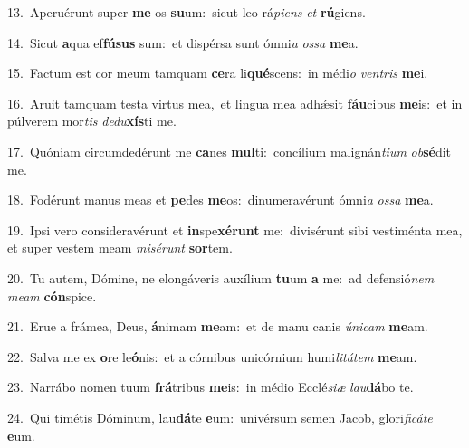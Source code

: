 {\numbfont\textcolor{\numbcolor}{13.}}~Aperuérunt super \textbf{me} os \textbf{su}\-um:~\star sicut leo rá\-\textit{pi}\-\textit{ens} \textit{et} \textbf{rú}\-giens.\par
{\numbfont\textcolor{\numbcolor}{14.}}~Sicut \textbf{a}\-qua ef\-\textbf{fú}\-\textbf{sus} sum:~\star et dispérsa sunt ómni\textit{a} \textit{os}\-\textit{sa} \textbf{me}\-a.\par
{\numbfont\textcolor{\numbcolor}{15.}}~Factum est cor meum tamquam \textbf{ce}\-ra li\-\textbf{qué}\-scens:~\star in médi\textit{o} \textit{ven}\-\textit{tris} \textbf{me}\-i.\par
{\numbfont\textcolor{\numbcolor}{16.}}~Aruit tamquam testa virtus mea,~\dagger et lingua mea adhǽsit \textbf{fáu}\-cibus \textbf{me}\-is:~\star et in púlverem mor\textit{tis} \textit{de}\-\textit{du}\textbf{xís}ti me.\par
{\numbfont\textcolor{\numbcolor}{17.}}~Quóniam circumdedérunt me \textbf{ca}\-nes \textbf{mul}\-ti:~\star concílium malignán\-\textit{ti}\-\textit{um} \textit{ob}\-\textbf{sé}dit me.\par
{\numbfont\textcolor{\numbcolor}{18.}}~Fodérunt manus meas et \textbf{pe}\-des \textbf{me}\-os:~\star dinumeravérunt ómni\textit{a} \textit{os}\-\textit{sa} \textbf{me}\-a.\par
{\numbfont\textcolor{\numbcolor}{19.}}~Ipsi vero consideravérunt et \textbf{in}\-spe\-\textbf{xé}\-\textbf{runt} me:~\star divisérunt sibi vestiménta mea, et super vestem meam \textit{mi}\-\textit{sé}\textit{runt} \textbf{sor}\-tem.\par
{\numbfont\textcolor{\numbcolor}{20.}}~Tu autem, Dómine, ne elongáveris auxílium \textbf{tu}\-um \textbf{a} me:~\star ad defensió\textit{nem} \textit{me}\-\textit{am} \textbf{cón}\-spice.\par
{\numbfont\textcolor{\numbcolor}{21.}}~Erue a frámea, Deus, \textbf{á}\-nimam \textbf{me}\-am:~\star et de manu canis \textit{ú}\-\textit{ni}\textit{cam} \textbf{me}\-am.\par
{\numbfont\textcolor{\numbcolor}{22.}}~Salva me ex \textbf{o}\-re le\-\textbf{ó}\-nis:~\star et a córnibus unicórnium humi\-\textit{li}\-\textit{tá}\textit{tem} \textbf{me}\-am.\par
{\numbfont\textcolor{\numbcolor}{23.}}~Narrábo nomen tuum \textbf{frá}\-tribus \textbf{me}\-is:~\star in médio Ecclé\-\textit{si}\-\textit{æ} \textit{lau}\-\textbf{dá}bo te.\par
{\numbfont\textcolor{\numbcolor}{24.}}~Qui timétis Dóminum, lau\-\textbf{dá}\-te \textbf{e}\-um:~\star univérsum semen Jacob, glori\-\textit{fi}\-\textit{cá}\textit{te} \textbf{e}\-um.\par
